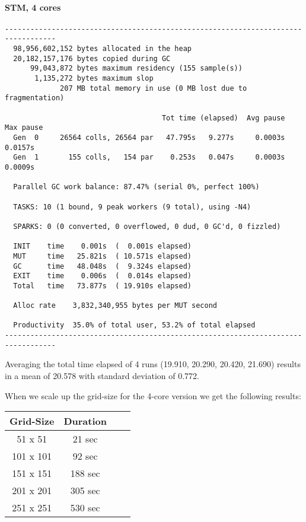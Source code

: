 \paragraph{STM, 4 cores}
\begin{verbatim}
----------------------------------------------------------------------------------
  98,956,602,152 bytes allocated in the heap
  20,182,157,176 bytes copied during GC
      99,043,872 bytes maximum residency (155 sample(s))
       1,135,272 bytes maximum slop
             207 MB total memory in use (0 MB lost due to fragmentation)

                                     Tot time (elapsed)  Avg pause  Max pause
  Gen  0     26564 colls, 26564 par   47.795s   9.277s     0.0003s    0.0157s
  Gen  1       155 colls,   154 par    0.253s   0.047s     0.0003s    0.0009s

  Parallel GC work balance: 87.47% (serial 0%, perfect 100%)

  TASKS: 10 (1 bound, 9 peak workers (9 total), using -N4)

  SPARKS: 0 (0 converted, 0 overflowed, 0 dud, 0 GC'd, 0 fizzled)

  INIT    time    0.001s  (  0.001s elapsed)
  MUT     time   25.821s  ( 10.571s elapsed)
  GC      time   48.048s  (  9.324s elapsed)
  EXIT    time    0.006s  (  0.014s elapsed)
  Total   time   73.877s  ( 19.910s elapsed)

  Alloc rate    3,832,340,955 bytes per MUT second

  Productivity  35.0% of total user, 53.2% of total elapsed
----------------------------------------------------------------------------------
\end{verbatim}
 
Averaging the total time elapsed of 4 runs (19.910, 20.290, 20.420, 21.690) results in a mean of 20.578 with standard deviation of 0.772.

When we scale up the grid-size for the 4-core version we get the following results:

\begin{center}
  \begin{tabular}{ c || c | c | c }
    Grid-Size & Duration \\ \hline \hline 
    51 x 51 & 21 sec \\ \hline
    101 x 101 & 92 sec \\ \hline
    151 x 151 & 188 sec \\ \hline
    201 x 201 & 305 sec \\ \hline
    251 x 251 & 530 sec \\ \hline
  \end{tabular}
\end{center}

